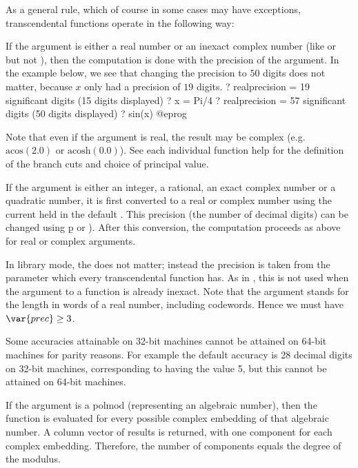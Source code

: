 As a general rule, which of course in some cases may have exceptions,
transcendental functions operate in the following way:

\item If the argument is either a real number or an inexact complex number
(like  or  but not ), then the
computation is done with the precision of the argument.
In the example below, we see that changing the precision to $50$ digits does
not matter, because $x$ only had a precision of $19$ digits.
\bprog
? 
   realprecision = 19 significant digits (15 digits displayed)
? x = Pi/4
? 
   realprecision = 57 significant digits (50 digits displayed)
? sin(x)
@eprog

Note that even if the argument is real, the result may be complex
(e.g.~$\text{acos}(2.0)$ or $\text{acosh}(0.0)$). See each individual
function help for the definition of the branch cuts and choice of principal
value.

\item If the argument is either an integer, a rational, an exact complex
number or a quadratic number, it is first converted to a real
or complex number using the current  held in the default
.  This precision (the number of decimal digits) can be
changed using \b{p} or ).
After this conversion, the computation proceeds as above for real or complex
arguments.

In library mode, the  does not matter; instead the
precision is taken from the  parameter which every transcendental
function has.  As in , this  is not used when the
argument to a function is already inexact.
Note that the argument  stands for the length in words of a real
number, including codewords. Hence we must have $\var{prec} \geq 3$.

Some accuracies attainable on 32-bit machines cannot be attained
on 64-bit machines for parity reasons. For example the default  accuracy
is 28 decimal digits on 32-bit machines, corresponding to  having
the value 5, but this cannot be attained on 64-bit machines.

\item If the argument is a polmod (representing an algebraic number),
then the function is evaluated for every possible complex embedding of that
algebraic number.  A column vector of results is returned, with one component
for each complex embedding.  Therefore, the number of components equals
the degree of the  modulus.

